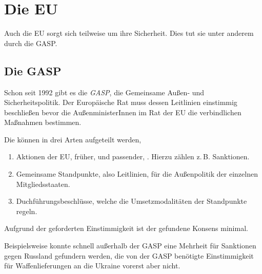 \documentclass{article}
\begin{document}
\section{Die EU}
Auch die EU sorgt sich teilweise um ihre Sicherheit. Dies tut sie unter anderem durch die GASP.
 
\subsection{Die GASP} 
Schon seit 1992 gibt es die \emph{GASP}, die Gemeinsame Außen- und Sicherheitspolitik. Der Europäische Rat muss dessen Leitlinien einstimmig beschließen bevor die AußenministerInnen im Rat der EU die verbindlichen Maßnahmen bestimmen.
 
Die können in drei Arten aufgeteilt werden, 
\begin{enumerate}
 \item Aktionen der EU, früher, und passender, . Hierzu zählen z.\,B. Sanktionen.
 \item Gemeinsame Standpunkte, also Leitlinien, für die Außenpolitik der einzelnen Mitgliedsstaaten.
 \item Duchführungsbeschlüsse, welche die Umsetzmodalitäten der Standpunkte regeln.
\end{enumerate} 
Aufgrund der geforderten Einstimmigkeit ist der gefundene Konsens minimal. 
 
Beispielsweise konnte schnell außerhalb der GASP eine Mehrheit für Sanktionen gegen Russland gefundern werden, die von der GASP benötigte Einstimmigkeit für Waffenlieferungen an die Ukraine vorerst aber nicht. 
\end{document}

